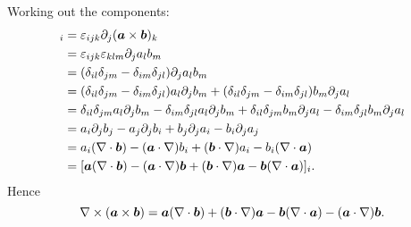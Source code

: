 \begin{example}
    Working out the components:
    \begin{align*}
        [\curl(\vv{a}\times\vv{b})]_i &= \varepsilon_{ijk}\partial_j(\vv{a}\times\vv{b})_k\\
        &= \varepsilon_{ijk}\varepsilon_{klm}\partial_ja_lb_m\\
        &= (\delta_{il}\delta_{jm} - \delta_{im}\delta_{jl})\partial_ja_lb_m\\
        &= (\delta_{il}\delta_{jm} - \delta_{im}\delta_{jl})a_l\partial_jb_m + (\delta_{il}\delta_{jm} - \delta_{im}\delta_{jl})b_m\partial_ja_l\\
        &= \delta_{il}\delta_{jm}a_l\partial_jb_m - \delta_{im}\delta_{jl}a_l\partial_jb_m + \delta_{il}\delta_{jm}b_m\partial_ja_l - \delta_{im}\delta_{jl}b_m\partial_ja_l\\
        &= a_i\partial_jb_j - a_j\partial_jb_i + b_j\partial_ja_i - b_i\partial_ja_j\\
        &= a_i(\div\vv{b}) - (\vv{a}\cdot\grad)b_i + (\vv{b}\cdot\grad)a_i - b_i(\div\vv{a})\\
        &= [\vv{a}(\div\vv{b}) - (\vv{a}\cdot\grad)\vv{b} + (\vv{b}\cdot\grad)\vv{a} - \vv{b}(\div\vv{a})]_i.
    \end{align*}
    Hence
    \[\nabla\times(\bm{a}\times\bm{b}) = \bm{a}(\nabla\cdot\bm{b}) + (\bm{b}\cdot\nabla)\bm{a} - \bm{b}(\nabla\cdot\bm{a}) - (\bm{a}\cdot\nabla)\bm{b}.\]
\end{example}

